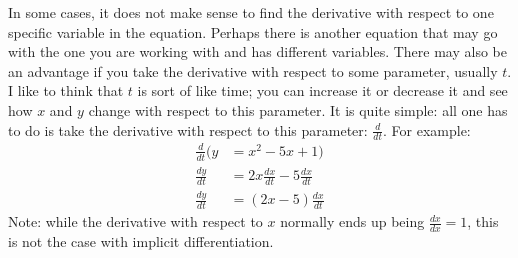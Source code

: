 \documentclass[../revisedMain.tex]{subfiles}
\begin{document}
	In some cases, it does not make sense to find the derivative with respect to one specific variable in the equation. Perhaps there is another equation that may go with the one you are working with and has different variables. There may also be an advantage if you take  the derivative with respect to some parameter, usually $t$. I like to think that $t$ is sort of like time; you can increase it or decrease it and see how $x$ and $y$ change with respect to this parameter. It is quite simple: all one has to do is take the derivative with respect to this parameter: $\displaystyle\frac{d}{dt} $. For example: 
	\begin{equation}
	\begin{split}
	\frac{d}{dt}( y&=x^2-5x+1)\\
	\frac{dy}{dt}&=2x\frac{dx}{dt}-5\frac{dx}{dt}\\
	\frac{dy}{dt}&=(2x-5)\frac{dx}{dt}
	\end{split}
	\end{equation}
	Note:  while the derivative with respect to $x$ normally ends up being $\displaystyle\frac{dx}{dx}=1$, this is not the case with implicit differentiation.\\
\end{document}
